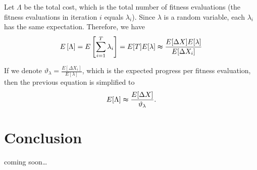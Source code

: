\documentclass[12pt, a4paper]{article}
\theoremstyle{remark}
\newcommand{\cm}{coming soon\dots}
\begin{document}
Let $\Lambda$ be the total cost, which is the total number of fitness evaluations (the fitness evaluations in iteration $i$ equals $\lambda_i$). Since $\lambda$ is a random variable, each $\lambda_i$ has the same expectation. Therefore, we have
\[
    E\left[\Lambda\right] = E\left[\sum_{i = 1}^{T} \lambda_i\right] = E[T] E[\lambda] \thickapprox \frac{E[\Delta X] E[\lambda]}{E[\Delta X_i]}
\]

If we denote $\vartheta_\lambda = \frac{E[\Delta X_i]}{E[\lambda]}$, which is the expected progress per fitness evaluation, then the previous equation is simplified to
\[
    E[\Lambda] \thickapprox \frac{E[\Delta X]}{\vartheta_\lambda}.
\]

\section{Conclusion}
\cm




\end{document}
